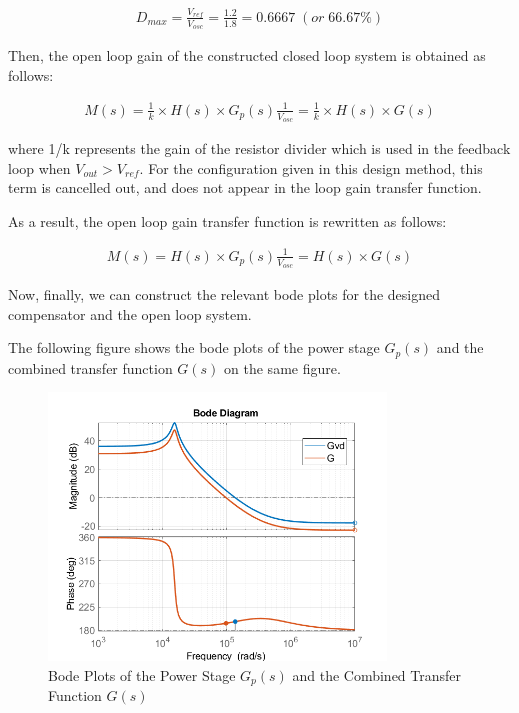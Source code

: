 \begin{align}
    D_{max} = \frac{V_{ref}}{V_{osc}} = \frac{1.2}{1.8} = 0.6667\;(or\; 66.67\%)
\end{align}

Then, the open loop gain of the constructed closed loop system is obtained as follows:

\begin{align}
    M(s) = \frac{1}{k}\times H(s)\times G_p(s)\frac{1}{V_{osc}} = \frac{1}{k}\times H(s)\times G(s)
\end{align}

where 1/k represents the gain of the resistor divider which is used in the feedback loop when  $V_{out} > V_{ref}$. For the configuration given in this design method, this term is cancelled out, and does not appear in the loop gain transfer function.

As a result, the open loop gain transfer function is rewritten as follows:

\begin{align}
    M(s) = H(s)\times G_p(s)\frac{1}{V_{osc}} = H(s)\times G(s)
\end{align}

Now, finally, we can construct the relevant bode plots for the designed compensator and the open loop system.

The following figure shows the bode plots of the power stage $G_p(s)$ and the combined transfer function $G(s)$ on the same figure.

\begin{figure}[H]
\begin{center}
\includegraphics[width=0.8\textwidth]{bode_plots/G_Gp_bode1.png}
\caption{Bode Plots of the Power Stage $G_p(s)$ and the Combined Transfer Function $G(s)$}
\label{com:G_Gp_bode1}
\end{center}
\end{figure}

